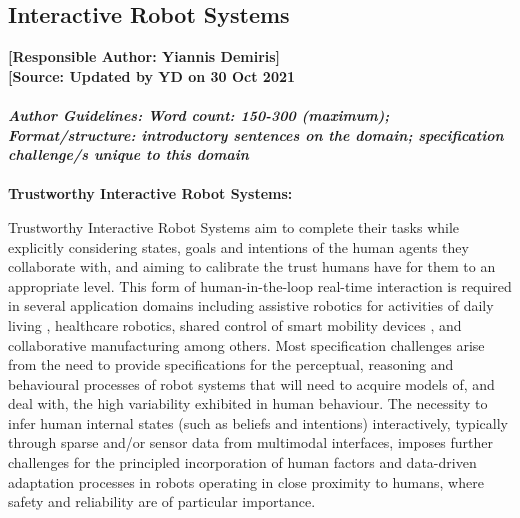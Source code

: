 \documentclass[sigconf]{acmart}
\begin{document}
\subsection{Interactive Robot Systems}
\textbf{[Responsible Author:  Yiannis Demiris]}\\
\noindent\textbf{[Source: Updated by YD on 30 Oct 2021}\\\\
\noindent\textbf{\textit{Author Guidelines: Word count: 150-300 (maximum); \\Format/structure: introductory sentences on the domain; specification challenge/s unique to this domain}}\\\\ 
\textbf{Trustworthy Interactive Robot Systems:} 

Trustworthy Interactive Robot Systems aim to complete their tasks while explicitly considering states, goals and intentions of the human agents they collaborate with, and aiming to calibrate the trust humans have for them to an appropriate level.  This form of human-in-the-loop real-time interaction is required in several application domains including assistive robotics for activities of daily living \cite{GaoEtAl2020}, healthcare robotics, shared control of smart mobility devices \cite{SohDemiris2015}, and collaborative manufacturing among others. Most specification challenges arise from the need to provide specifications for the perceptual, reasoning and behavioural processes of robot systems that will need to acquire models of, and deal with, the high variability exhibited in human behaviour. The necessity to infer human internal states (such as beliefs and intentions\cite{Demiris2007}) interactively, typically through sparse and/or sensor data from multimodal interfaces, imposes further challenges for the principled incorporation of human factors and data-driven adaptation processes in robots operating in close proximity to humans, where safety and reliability are of particular importance. 



\end{document}

